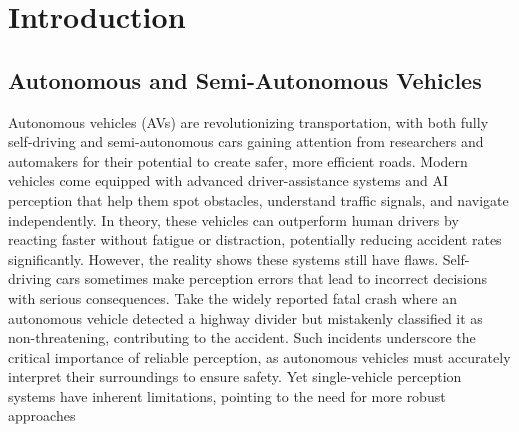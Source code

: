 \chapter{Introduction}
\label{introduction}

\section{Autonomous and Semi-Autonomous Vehicles}
Autonomous vehicles (AVs) are revolutionizing transportation, with both fully self-driving and semi-autonomous cars gaining attention from researchers and automakers for their potential to create safer, more efficient roads.
Modern vehicles come equipped with advanced driver-assistance systems and AI perception that help them spot obstacles, understand traffic signals, and navigate independently.
In theory, these vehicles can outperform human drivers by reacting faster without fatigue or distraction, potentially reducing accident rates significantly.
However, the reality shows these systems still have flaws. Self-driving cars sometimes make perception errors that lead to incorrect decisions with serious consequences.
Take the widely reported fatal crash where an autonomous vehicle detected a highway divider but mistakenly classified it as non-threatening, contributing to the accident.
Such incidents underscore the critical importance of reliable perception, as autonomous vehicles must accurately interpret their surroundings to ensure safety.
Yet single-vehicle perception systems have inherent limitations, pointing to the need for more robust approaches

